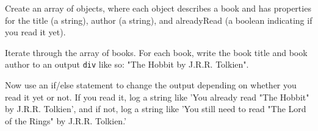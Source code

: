 \documentclass[english,11pt,a4paper]{report}
\begin{document}
\begin{ex}
Create an array of objects, where each object describes a book and has properties for the title (a string), author (a string), and alreadyRead (a boolean indicating if you read it yet).

Iterate through the array of books. For each book, write the book title and book author to an output \verb|div| like so: "The Hobbit by J.R.R. Tolkien".

Now use an if/else statement to change the output depending on whether you read it yet or not. If you read it, log a string like 'You already read "The Hobbit" by J.R.R. Tolkien', and if not, log a string like 'You still need to read "The Lord of the Rings" by J.R.R. Tolkien.'
\end{ex}
\end{document}

